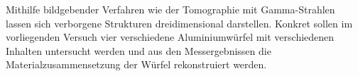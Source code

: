 Mithilfe bildgebender Verfahren wie der Tomographie mit Gamma-Strahlen lassen
sich verborgene Strukturen dreidimensional darstellen. Konkret sollen im
vorliegenden Versuch vier verschiedene Aluminiumwürfel mit verschiedenen Inhalten
untersucht werden und aus den Messergebnissen die Materialzusammensetzung der
Würfel rekonstruiert werden.
